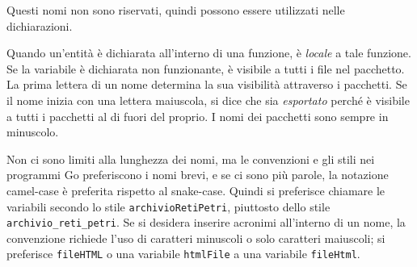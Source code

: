 \documentclass[../../thesis.tex]{subfiles}
\begin{document}
    Questi nomi non sono riservati, quindi possono essere utilizzati nelle dichiarazioni.
    \hfill \vspace{12pt}

    Quando un'entità è dichiarata all'interno di una funzione, è \textit{locale} a tale funzione.
    Se la variabile è dichiarata non funzionante, è visibile a tutti i file nel pacchetto.
    La prima lettera di un nome determina la sua visibilità attraverso i pacchetti.
    Se il nome inizia con una lettera maiuscola, si dice che sia \textit{esportato} perché è visibile a tutti i pacchetti al di fuori del proprio.
    I nomi dei pacchetti sono sempre in minuscolo.
    \hfill \vspace{12pt}

    Non ci sono limiti alla lunghezza dei nomi, ma le convenzioni e gli stili nei programmi Go preferiscono i nomi brevi, e se ci sono più parole, la notazione camel-case è preferita rispetto al snake-case.
    Quindi si preferisce chiamare le variabili secondo lo stile \verb"archivioRetiPetri", piuttosto dello stile \verb"archivio_reti_petri".
    Se si desidera inserire acronimi all'interno di un nome, la convenzione richiede l'uso di caratteri minuscoli o solo caratteri maiuscoli;
    si preferisce \verb"fileHTML" o una variabile \verb"htmlFile" a una variabile \verb"fileHtml".
\end{document}
